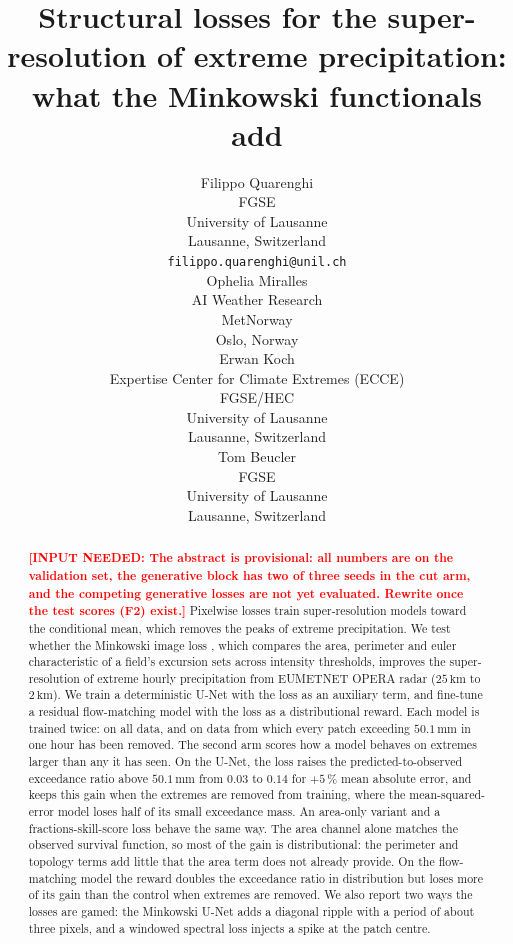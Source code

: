 \documentclass{article}
\title{Structural losses for the super-resolution of extreme precipitation: what the Minkowski functionals add}
\author{
 Filippo Quarenghi \\
  FGSE\\
  University of Lausanne\\
  Lausanne, Switzerland\\
  \texttt{filippo.quarenghi@unil.ch} \\
   \And
 Ophelia Miralles \\
  AI Weather Research\\
  MetNorway\\
  Oslo, Norway\\
    \And
 Erwan Koch \\
  Expertise Center for Climate Extremes (ECCE)\\
  FGSE/HEC\\
  University of Lausanne\\
  Lausanne, Switzerland\\
  \And
 Tom Beucler \\
  FGSE\\
  University of Lausanne\\
  Lausanne, Switzerland\\
}
\newcommand{\needinput}[1]{\textcolor{red}{\textbf{[INPUT NEEDED: #1]}}}
\begin{document}
\maketitle

\begin{abstract}
\needinput{The abstract is provisional: all numbers are on the validation set, the generative block has two of
three seeds in the cut arm, and the competing generative losses are not yet evaluated. Rewrite once the test
scores (F2) exist.}
Pixelwise losses train super-resolution models toward the conditional mean, which removes the peaks of extreme
precipitation. We test whether the Minkowski image loss \citep{quarenghi2026minkowski}, which compares the area,
perimeter and euler characteristic of a field's excursion sets across intensity thresholds, improves the
super-resolution of extreme hourly precipitation from EUMETNET OPERA radar ($25\,\mathrm{km}$ to $2\,\mathrm{km}$).
We train a deterministic U-Net with the loss as an auxiliary term, and fine-tune a residual flow-matching model with
the loss as a distributional reward. Each model is trained twice: on all data, and on data from which every patch
exceeding $50.1\,\mathrm{mm}$ in one hour has been removed. The second arm scores how a model behaves on extremes
larger than any it has seen. On the U-Net, the loss raises the predicted-to-observed exceedance ratio above
$50.1\,\mathrm{mm}$ from $0.03$ to $0.14$ for $+5\,\%$ mean absolute error, and keeps this gain when the extremes are
removed from training, where the mean-squared-error model loses half of its small exceedance mass. An area-only
variant and a fractions-skill-score loss behave the same way. The area channel alone matches the observed survival
function, so most of the gain is distributional: the perimeter and topology terms add little that the area term does
not already provide. On the flow-matching model the reward doubles the exceedance ratio in distribution but loses more of
its gain than the control when extremes are removed. We also report two ways the losses are gamed: the Minkowski
U-Net adds a diagonal ripple with a period of about three pixels, and a windowed spectral loss injects a spike at the
patch centre.
\end{abstract}


\end{document}
